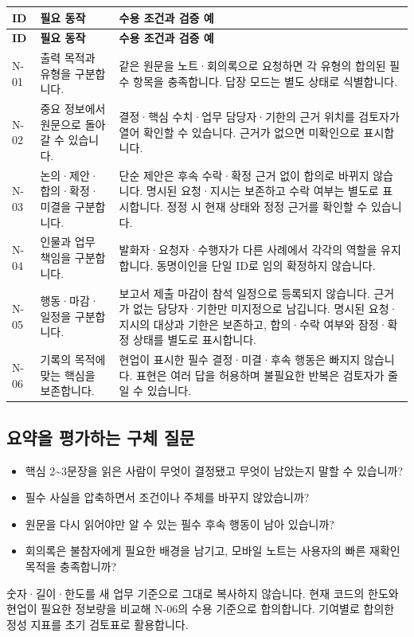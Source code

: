 \documentclass[a4paper,10pt]{article}
\newcommand{\Hline}{\noalign{\hrule height 1.5pt}}
\begin{document}
{\fontsize{9.5}{14.06}\selectfont
\begin{longtable}{!{\vrule width 1.5pt}L{18.94mm}|L{55.23mm}|L{83.63mm}!{\vrule width 1.5pt}}
\Hline{} \textbf{ID} & \textbf{필요 동작} & \textbf{수용 조건과 검증 예}\\\hline\endfirsthead
\Hline{} \textbf{ID} & \textbf{필요 동작} & \textbf{수용 조건과 검증 예}\\\hline\endhead
\hline\endfoot\Hline\endlastfoot
N-01 & 출력 목적과 유형을 구분합니다. & 같은 원문을 노트·회의록으로 요청하면 각 유형의 합의된 필수 항목을 충족합니다. 답장 모드는 별도 상태로 식별합니다.\\\hline
N-02 & 중요 정보에서 원문으로 돌아갈 수 있습니다. & 결정·핵심 수치·업무 담당자·기한의 근거 위치를 검토자가 열어 확인할 수 있습니다. 근거가 없으면 미확인으로 표시합니다.\\\hline
N-03 & 논의·제안·합의·확정·미결을 구분합니다. & 단순 제안은 후속 수락·확정 근거 없이 합의로 바뀌지 않습니다. 명시된 요청·지시는 보존하고 수락 여부는 별도로 표시합니다. 정정 시 현재 상태와 정정 근거를 확인할 수 있습니다.\\\hline
N-04 & 인물과 업무 책임을 구분합니다. & 발화자·요청자·수행자가 다른 사례에서 각각의 역할을 유지합니다. 동명이인을 단일 ID로 임의 확정하지 않습니다.\\\hline
N-05 & 행동·마감·일정을 구분합니다. & 보고서 제출 마감이 참석 일정으로 등록되지 않습니다. 근거가 없는 담당자·기한만 미지정으로 남깁니다. 명시된 요청·지시의 대상과 기한은 보존하고, 합의·수락 여부와 잠정·확정 상태를 별도로 표시합니다.\\\hline
N-06 & 기록의 목적에 맞는 핵심을 보존합니다. & 현업이 표시한 필수 결정·미결·후속 행동은 빠지지 않습니다. 표현은 여러 답을 허용하며 불필요한 반복은 검토자가 줄일 수 있습니다.\\\hline
\end{longtable}}
\subsection*{요약을 평가하는 구체 질문}
\begin{itemize}
\item 핵심 2\textasciitilde{}3문장을 읽은 사람이 무엇이 결정됐고 무엇이 남았는지 말할 수 있습니까?
\item 필수 사실을 압축하면서 조건이나 주체를 바꾸지 않았습니까?
\item 원문을 다시 읽어야만 알 수 있는 필수 후속 행동이 남아 있습니까?
\item 회의록은 불참자에게 필요한 배경을 남기고, 모바일 노트는 사용자의 빠른 재확인 목적을 충족합니까?
\end{itemize}
숫자·길이·한도를 새 업무 기준으로 그대로 복사하지 않습니다. 현재 코드의 한도와 현업이 필요한 정보량을 비교해 N-06의 수용 기준으로 합의합니다. 기여별로 합의한 정성 지표를 초기 검토표로 활용합니다.
\end{document}
